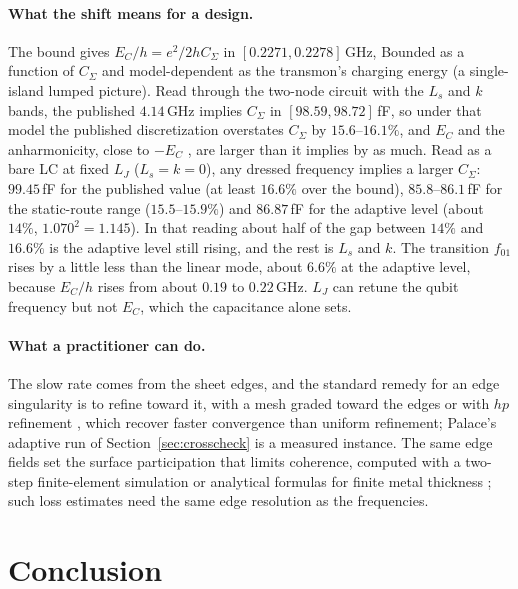 \documentclass{anvil-paper}
\begin{document}
\paragraph{What the shift means for a design.}
The bound gives $E_C/h = e^2/2hC_\Sigma$ in $[0.2271, 0.2278]$\,GHz,
Bounded as a function of $C_\Sigma$ and model-dependent as the transmon's
charging energy (a single-island lumped picture). Read through the
two-node circuit with the $L_s$ and $k$ bands, the published $4.14$\,GHz
implies $C_\Sigma$ in $[98.59, 98.72]$\,fF, so under that model the
published discretization overstates $C_\Sigma$ by $15.6$--$16.1\%$, and
$E_C$ and the anharmonicity, close to $-E_C$ \citep{koch2007charge}, are
larger than it implies by as much. Read as a bare LC at fixed $L_J$ ($L_s
= k = 0$), any dressed frequency implies a larger $C_\Sigma$: $99.45$\,fF
for the published value (at least $16.6\%$ over the bound), $85.8$--$86.1$\,fF
for the static-route range ($15.5$--$15.9\%$) and $86.87$\,fF for the
adaptive level (about $14\%$, $1.070^2 = 1.145$). In that reading about
half of the gap between $14\%$ and $16.6\%$ is the adaptive level still
rising, and the rest is $L_s$ and $k$. The transition $f_{01}$ rises by a
little less than the linear mode, about $6.6\%$ at the adaptive level,
because $E_C/h$ rises from about $0.19$ to $0.22$\,GHz. $L_J$ can retune
the qubit frequency but not $E_C$, which the capacitance alone sets.

\paragraph{What a practitioner can do.}
The slow rate comes from the sheet edges, and the standard remedy for an
edge singularity is to refine toward it, with a mesh graded toward the
edges or with $hp$ refinement \citep{demkowicz2006computing}, which recover
faster convergence than uniform refinement; Palace's adaptive run of
Section~\ref{sec:crosscheck} is a measured instance. The same edge fields
set the surface participation that limits coherence, computed with a
two-step finite-element simulation \citep{wang2015surface} or analytical
formulas for finite metal thickness \citep{martinis2022surface}; such loss
estimates need the same edge resolution as the frequencies.

\section{Conclusion}
\label{sec:conclusion}
\end{document}
